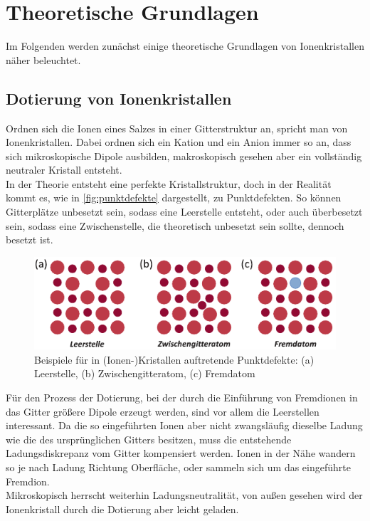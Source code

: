 \section{Theoretische Grundlagen}
\label{sec:theorie}

Im Folgenden werden zunächst einige theoretische Grundlagen von Ionenkristallen näher beleuchtet.

\subsection{Dotierung von Ionenkristallen}

Ordnen sich die Ionen eines Salzes in einer Gitterstruktur an, spricht man von Ionenkristallen. 
Dabei ordnen sich ein Kation und ein Anion immer so an, dass sich mikroskopische Dipole ausbilden, makroskopisch gesehen aber ein vollständig neutraler Kristall entsteht. \\
In der Theorie entsteht eine perfekte Kristallstruktur, doch in der Realität kommt es, wie in \autoref{fig:punktdefekte} dargestellt, zu Punktdefekten.
So können Gitterplätze unbesetzt sein, sodass eine Leerstelle entsteht, oder auch überbesetzt sein, sodass eine Zwischenstelle, die theoretisch unbesetzt sein sollte, dennoch besetzt ist.

\begin{figure}[H]
    \centering
    \includegraphics[]{figures/Fehlstellen.pdf}
    \caption{Beispiele für in (Ionen-)Kristallen auftretende Punktdefekte: (a) Leerstelle, (b) Zwischengitteratom, (c) Fremdatom \cite[S. ~38]{grossmarx}}
    \label{fig:punktdefekte}
\end{figure}

Für den Prozess der Dotierung, bei der durch die Einführung von Fremdionen in das Gitter größere Dipole erzeugt werden, sind vor allem die Leerstellen interessant.
Da die so eingeführten Ionen aber nicht zwangsläufig dieselbe Ladung wie die des ursprünglichen Gitters besitzen, muss die entstehende Ladungsdiskrepanz vom Gitter kompensiert werden.
Ionen in der Nähe wandern so je nach Ladung Richtung Oberfläche, oder sammeln sich um das eingeführte Fremdion. \\
Mikroskopisch herrscht weiterhin Ladungsneutralität, von außen gesehen wird der Ionenkristall durch die Dotierung aber leicht geladen.

